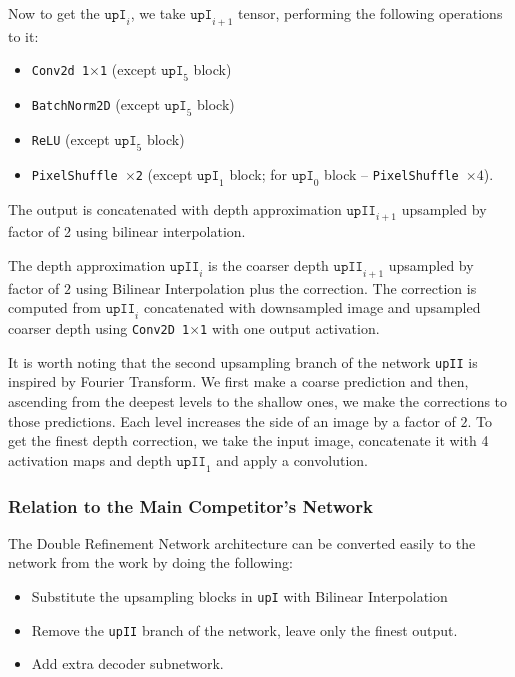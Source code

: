 \documentclass[10pt,twocolumn,letterpaper]{article}
\begin{document}
Now to get the $\texttt{upI}_i$, we take $\texttt{upI}_{i+1}$ tensor, 
performing the following operations to it:

\begin{itemize}
  \item \texttt{Conv2d 1$\times$1} (except $\texttt{upI}_{5}$ block)
  \item \texttt{BatchNorm2D} (except $\texttt{upI}_{5}$ block)
  \item \texttt{ReLU} (except $\texttt{upI}_{5}$ block)
  \item \texttt{PixelShuffle $\times$2} (except $\texttt{upI}_{1}$ block; for $\texttt{upI}_{0}$ block -- \texttt{PixelShuffle $\times 4$}).
\end{itemize}

The output is concatenated  with depth approximation $\texttt{upII}_{i + 1}$ upsampled by
factor of 2 using bilinear interpolation.

The depth approximation $\texttt{upII}_{i}$ is the coarser depth
$\texttt{upII}_{i + 1}$ upsampled by factor of $2$ using Bilinear Interpolation 
plus the correction. The correction is computed from
$\texttt{upII}_{i}$ concatenated with downsampled image and upsampled coarser depth 
using \texttt{Conv2D 1$\times$1} with one output activation.

It is worth noting that the second upsampling branch of the network
\texttt{upII} is inspired by Fourier Transform. We first make a coarse
prediction and then, ascending from the deepest levels to the shallow ones,
we make the corrections to those predictions. Each level increases the side of an
image by a factor of $2$.
To get the finest depth correction, we take the input image, concatenate it
with 4 activation maps and depth $\texttt{upII}_1$ and apply a convolution. 


\subsubsection{Relation to the Main Competitor's Network}

The Double Refinement Network architecture can be converted easily to the network from
the work \cite{hu2018revisiting} by doing the following:

\begin{itemize}
    \item Substitute the upsampling blocks in \texttt{upI} with Bilinear Interpolation
    \item Remove the \texttt{upII} branch of the network, leave only the finest output.
    \item Add extra decoder subnetwork.
\end{itemize}
\end{document}
